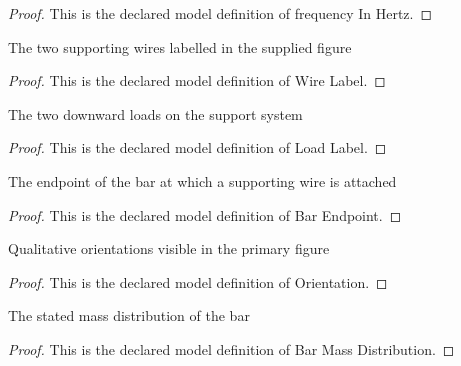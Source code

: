 \begin{proof}
  This is the declared model definition of frequency In Hertz.
\end{proof}
\begin{definition}
  \label{def:physics:phyx-mini-0172:phyxminiproblems-problemphyxmini0172-wirelabel}
  The two supporting wires labelled in the supplied figure
\end{definition}
\begin{proof}
  This is the declared model definition of Wire Label.
\end{proof}
\begin{definition}
  \label{def:physics:phyx-mini-0172:phyxminiproblems-problemphyxmini0172-loadlabel}
  The two downward loads on the support system
\end{definition}
\begin{proof}
  This is the declared model definition of Load Label.
\end{proof}
\begin{definition}
  \label{def:physics:phyx-mini-0172:phyxminiproblems-problemphyxmini0172-barendpoint}
  The endpoint of the bar at which a supporting wire is attached
\end{definition}
\begin{proof}
  This is the declared model definition of Bar Endpoint.
\end{proof}
\begin{definition}[Orientation]
  \label{def:physics:phyx-mini-0172:phyxminiproblems-problemphyxmini0172-orientation}
  Qualitative orientations visible in the primary figure
\end{definition}
\begin{proof}
  This is the declared model definition of Orientation.
\end{proof}
\begin{definition}
  \label{def:physics:phyx-mini-0172:phyxminiproblems-problemphyxmini0172-barmassdistribution}
  The stated mass distribution of the bar
\end{definition}
\begin{proof}
  This is the declared model definition of Bar Mass Distribution.
\end{proof}
